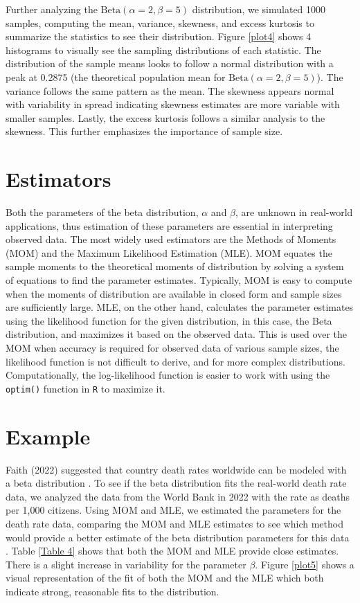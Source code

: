 \documentclass{article}\usepackage[]{graphicx}\usepackage[]{xcolor}
\begin{document}
\begin{multicols}{2}
Further analyzing the \(\text{Beta}(\alpha = 2, \beta = 5)\) distribution, we simulated 1000 samples, computing the mean, variance, skewness, and excess kurtosis to summarize the statistics to see their distribution. Figure \ref{plot4} shows 4 histograms to visually see the sampling distributions of each statistic. The distribution of the sample means looks to follow a normal distribution with a peak at 0.2875 (the theoretical population mean for  \(\text{Beta}(\alpha = 2, \beta = 5)\)). The variance follows the same pattern as the mean. The skewness appears normal with variability in spread indicating skewness estimates are more variable with smaller samples. Lastly, the excess kurtosis follows a similar analysis to the skewness. This further emphasizes the importance of sample size. 

\section{Estimators}
Both the parameters of the beta distribution,  \(\alpha\) and \(\beta\), are unknown in real-world applications, thus estimation of these parameters are essential in interpreting observed data. The most widely used estimators are the Methods of Moments (MOM) and the Maximum Likelihood Estimation (MLE). MOM equates the sample moments to the theoretical moments of distribution by solving a system of equations to find the parameter estimates. Typically, MOM is easy to compute when the moments of distribution are available in closed form and sample sizes are sufficiently large. MLE, on the other hand, calculates the parameter estimates using the likelihood function for the given distribution, in this case, the Beta distribution, and maximizes it based on the observed data. This is used over the MOM when accuracy is required for observed data of various sample sizes, the likelihood function is not difficult to derive, and for more complex distributions. Computationally, the log-likelihood function is easier to work with using the \texttt{optim()} function in \texttt{R} to maximize it. 

\section{Example}
Faith (2022) suggested that country death rates worldwide can be modeled with a beta distribution \citep{Fatih2022}. To see if the beta distribution fits the real-world death rate data, we analyzed the data from the World Bank in 2022 with the rate as deaths per 1,000 citizens. Using MOM and MLE, we estimated the parameters for the death rate data, comparing the MOM and MLE estimates to see which method would provide a better estimate of the beta distribution parameters for this data \citep{nleqslv}. Table \ref{Table 4} shows that both the MOM and MLE provide close estimates. There is a slight increase in variability for the parameter \(\beta\). Figure \ref{plot5} shows a visual representation of the fit of both the MOM and the MLE which both indicate strong, reasonable fits to the distribution. 


\end{multicols}
\end{document}
